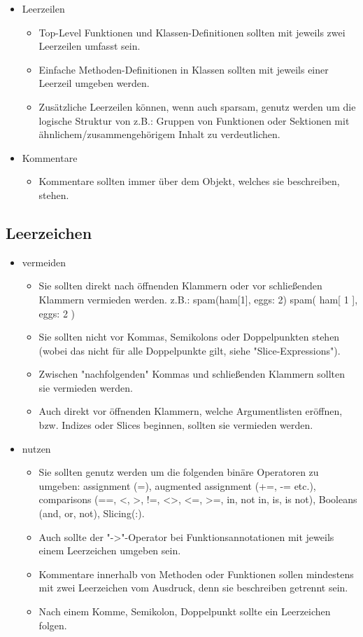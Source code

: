 \begin{itemize}
\begin{itemize}
\end{itemize}
\item Leerzeilen
\begin{itemize}
\item Top-Level Funktionen und Klassen-Definitionen sollten mit jeweils zwei Leerzeilen umfasst sein.
\item Einfache Methoden-Definitionen in Klassen sollten mit jeweils einer Leerzeil umgeben werden.
\item Zusätzliche Leerzeilen können, wenn auch sparsam, genutz werden um die logische Struktur von z.B.: Gruppen von Funktionen oder Sektionen mit ähnlichem/zusammengehörigem Inhalt zu verdeutlichen.
\end{itemize}
\item Kommentare
\begin{itemize}
\item Kommentare sollten immer über dem Objekt, welches sie beschreiben, stehen.
\end{itemize}
\end{itemize}

\subsection{Leerzeichen}
\begin{itemize}
\item vermeiden
\begin{itemize}
\item Sie sollten direkt nach öffnenden Klammern oder vor schließenden Klammern vermieden werden.
z.B.: spam(ham[1], {eggs: 2})
	  spam( ham[ 1 ], { eggs: 2 } )
\item Sie sollten nicht vor Kommas, Semikolons oder Doppelpunkten stehen (wobei das nicht für alle Doppelpunkte gilt, siehe "Slice-Expressions").
\item Zwischen "nachfolgenden" Kommas und schließenden Klammern sollten sie vermieden werden.
\item Auch direkt vor öffnenden Klammern, welche Argumentlisten eröffnen, bzw. Indizes oder Slices beginnen, sollten sie vermieden werden.
\end{itemize}
\item nutzen
\begin{itemize}
\item Sie sollten genutz werden um die folgenden binäre Operatoren zu umgeben: assignment (=), augmented assignment (+=, -= etc.), comparisons (==, <, >, !=, <>, <=, >=, in, not in, is, is not), Booleans (and, or, not), Slicing(:).
\item Auch sollte der "->"-Operator bei Funktionsannotationen mit jeweils einem Leerzeichen umgeben sein.
\item Kommentare innerhalb von Methoden oder Funktionen sollen mindestens mit zwei Leerzeichen vom Ausdruck, denn sie beschreiben getrennt sein.
\item Nach einem Komme, Semikolon, Doppelpunkt sollte ein Leerzeichen folgen.
\end{itemize}
\end{itemize}

